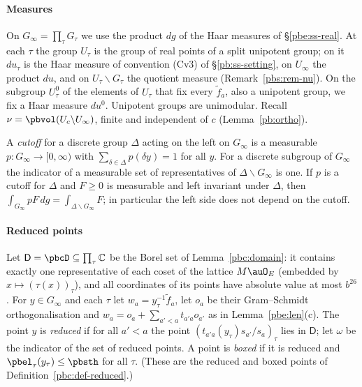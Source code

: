 \documentclass[10pt]{amsart}
\theoremstyle{definition}
\theoremstyle{remark}
\newcommand{\C}{\mathbb C}
\begin{document}
\paragraph*{Measures} On $G_\infty=\prod_\tau G_\tau$ we use the product $dg$ of the Haar
measures of \S\ref{pbe:ss-real}. At each $\tau$ the group $U_\tau$ is the group of real points of a
split unipotent group; on it $du_\tau$ is the Haar measure of convention (Cv3) of
\S\ref{pb:ss-setting}, on $U_\infty$ the product $du$, and on $U_\tau\backslash G_\tau$ the quotient
measure (Remark~\ref{pbs:rem-nu}). On the subgroup $U^0_\tau$ of the elements of $U_\tau$ that fix
every $\tilde f_a$, also a unipotent group, we fix a Haar measure $du^0$. Unipotent groups are
unimodular. Recall $\nu=\pbvol(U_c\backslash U_\infty)$, finite and independent of $c$
(Lemma~\ref{pb:ortho}).

A \emph{cutoff} for a discrete group $\Delta$ acting on the left on $G_\infty$ is a measurable
$p\colon G_\infty\to[0,\infty)$ with $\sum_{\delta\in\Delta}p(\delta y)=1$ for all $y$. For a
discrete subgroup of $G_\infty$ the indicator of a measurable set of representatives of
$\Delta\backslash G_\infty$ is one. If $p$ is a cutoff for $\Delta$ and $F\ge0$ is measurable and
left invariant under $\Delta$, then $\int_{G_\infty}pF\,dg=\int_{\Delta\backslash G_\infty}F$; in
particular the left side does not depend on the cutoff.

\paragraph*{Reduced points}
Let $\mathsf D=\pbcD\subseteq\prod_\tau\C$ be the Borel set of Lemma~\ref{pbc:domain}: it contains
exactly one representative of each coset of the lattice $M\auO_E$ (embedded by $x\mapsto(\tau(x))_\tau$),
and all coordinates of its points have absolute value at most $b^{26}$. For $y\in G_\infty$ and each $\tau$ let $w_a=y_\tau^{-1}\tilde f_a$,
let $o_a$ be their Gram--Schmidt orthogonalisation and $w_a=o_a+\sum_{a'<a}t_{a'a}o_{a'}$ as in
Lemma~\ref{pbe:len}(c). The point $y$ is \emph{reduced} if for all $a'<a$ the point
$(t_{a'a}(y_\tau)s_{a'}/s_a)_\tau$ lies in $\mathsf D$; let $\omega$ be the indicator of the set of
reduced points. A point is \emph{boxed} if it is reduced and $\pbel_\tau(y_\tau)\le\pbsth$ for all
$\tau$. (These are the reduced and boxed points of Definition~\ref{pbc:def-reduced}.)
\end{document}

